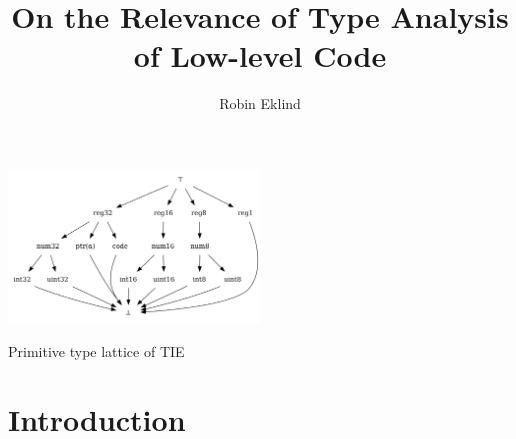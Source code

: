 \documentclass[10pt, a4paper, sigplan, authordraft]{acmart}
\title{On the Relevance of Type Analysis of Low-level Code}
\author{Robin Eklind}
\affiliation{
	\institution{Royal Institute of Technology (KTH)}
	\city{Stockholm}
	\country{Sweden}
}
\begin{document}





\begin{teaserfigure}
	\centering
	\includegraphics[width=0.5\textwidth]{inc/base_type_lattice.png}
	\caption{Primitive type lattice of TIE}
	\label{fig:base_type_lattice}
\end{teaserfigure}


\maketitle



\section{Introduction}

\end{document}
